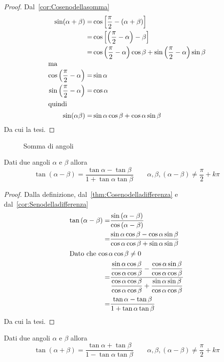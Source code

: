 \begin{proof}
	Dal~\vref{cor:Cosenodellasomma}
	\begin{align*}
	\sin(\alpha+\beta)=&\cos\left[\dfrac{\pi}{2}-\left(\alpha+\beta\right)\right]\\
	=&\cos\left[\left(\dfrac{\pi}{2}-\alpha\right)-\beta\right]\\
	=&\cos\left(\dfrac{\pi}{2}-\alpha\right)\cos\beta+\sin\left(\dfrac{\pi}{2}-\alpha\right)\sin\beta\\
	\intertext{ma}
	\cos\left(\dfrac{\pi}{2}-\alpha\right)=&\sin\alpha\\
	\sin\left(\dfrac{\pi}{2}-\alpha\right)=&\cos\alpha\\
	\intertext{quindi}
	\sin(\alpha\beta)=&\sin\alpha\cos\beta+\cos\alpha\sin\beta\\
	\end{align*}
	Da cui la tesi.
\end{proof}
\begin{figure}
	\centering
	
	\caption[Somma di angoli]{Somma di angoli}
	\label{fig:sommaangoli}
\end{figure}
\begin{thm}\label{thm:tangentedifferenza}
Dati due angoli $\alpha$ e $\beta$ allora\[\tan\left(\alpha-\beta\right)=\dfrac{\tan\alpha-\tan\beta}{1+\tan\alpha\tan\beta}\qquad\alpha,\beta,(\alpha-\beta)\neq\dfrac{\pi}{2}+k\pi\]
\end{thm}
\begin{proof}
	Dalla definizione, dal~\vref{thm:Cosenodelladifferenza} e dal~\vref{cor:Senodelladifferenza}
	\begin{align*}
	\tan\left(\alpha-\beta\right)=&\dfrac{\sin\left(\alpha-\beta\right)}{\cos\left(\alpha-\beta\right)}\\
	=&\dfrac{\sin\alpha\cos\beta-\cos\alpha\sin\beta}{\cos\alpha\cos\beta+\sin\alpha\sin\beta}\\
	\intertext{Dato che $\cos\alpha\cos\beta\neq 0$}
	=&\dfrac{\dfrac{\sin\alpha\cos\beta}{\cos\alpha\cos\beta}-\dfrac{\cos\alpha\sin\beta}{\cos\alpha\cos\beta}}{\dfrac{\cos\alpha\cos\beta}{\cos\alpha\cos\beta}+\dfrac{\sin\alpha\sin\beta}{\cos\alpha\cos\beta}}\\
	=&\dfrac{\tan\alpha-\tan\beta}{1+\tan\alpha\tan\beta}\\
	\end{align*}
	Da cui la tesi.
\end{proof}
\begin{cor}\label{cor:Tangentesommadiangoli}
	Dati due angoli $\alpha$ e $\beta$ allora\[\tan\left(\alpha+\beta\right)=\dfrac{\tan\alpha+\tan\beta}{1-\tan\alpha\tan\beta}\qquad\alpha,\beta,(\alpha-\beta)\neq\dfrac{\pi}{2}+k\pi\]
\end{cor}
